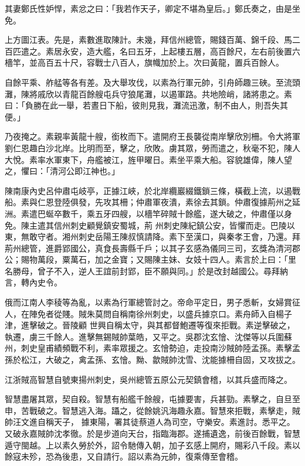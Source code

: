 \begin{pinyinscope}
 其妻鄭氏性妒悍，素忿之曰：「我若作天子，卿定不堪為皇后。」鄭氏奏之，由是坐免。



 上方圖江表。先是，素數進取陳計。未幾，拜信州總管，賜錢百萬、錦千段、馬二百匹遣之。素居永安，造大艦，名曰五牙，上起樓五層，高百餘尺，左右前後置六檣竿，並高百五十尺，容戰士八百人，旗幟加於上。次曰黃龍，置兵百餘人。



 自餘平乘、舴艋等各有差。及大舉攻伐，以素為行軍元帥，引舟師趣三硤。至流頭灘，陳將戚欣以青龍百餘艘屯兵守狼尾灘，以遏軍路。共地險峭，諸將患之。素曰：「負勝在此一舉，若晝日下船，彼則見我，灘流迅激，制不由人，則吾失其
 便。」



 乃夜掩之。素親率黃龍十艘，銜枚而下。遣開府王長襲從南岸擊欣別柵。令大將軍劉仁恩趣白沙北岸。比明而至，擊之，欣敗。虜其眾，勞而遣之，秋毫不犯，陳人大悅。素率水軍東下，舟艦被江，旌甲曜日。素坐平乘大船。容貌雄偉，陳人望之，懼曰：「清河公即江神也。」



 陳南康內史呂仲肅屯岐亭，正據江峽，於北岸纜巖綴鐵鎖三條，橫截上流，以遏戰船。素與仁恩登陸俱發，先攻其柵；仲肅軍夜潰，素徐去其鎖。仲肅復據荊州之延洲。素遣巴蜒卒數千，乘五牙四艘，以檣竿碎賊十餘艦，遂大破之，仲肅僅以身免。陳主遣其信州刺史顧覺鎮安蜀城，荊
 州刺史陳紀鎮公安，皆懼而走。巴陵以東，無敢守者。湘州刺史岳陽王陳叔慎請降。素下至漢口，與秦孝王會，乃還。拜荊州總管，進爵郢國公，真食長壽縣千戶；以其子玄感為儀同三司，玄獎為清河郡公；賜物萬段，粟萬石，加之金寶；又賜陳主妹、女妓十四人。素言於上曰：「里名勝母，曾子不入，逆人王誼前封郢，臣不願與同。」於是改封越國公。尋拜納言，轉內史令。



 俄而江南人李稜等為亂，以素為行軍總管討之。帝命平定日，男子悉斬，女婦賞征人，在陣免者從賤。賊朱莫問自稱南徐州刺史，以盛兵據京口。素舟師入自楊子津，進擊破之。晉陵顧
 世興自稱太守，與其都督鮑遷等復來拒戰。素逆擊破之，執遷，虜三千餘人。進擊無錫賊帥葉皓，又平之。吳郡沈玄懀、沈傑等以兵圍蘇州，刺史皇甫績頻戰不利，素率眾援之。玄懀勢迫，走投南沙賊帥陸孟孫。素擊孟孫於松江，大破之，禽孟孫、玄懀。黝、歙賊帥沈雪、沈能據柵自固，又攻拔之。



 江浙賊高智慧自號東揚州刺史，吳州總管五原公元契鎮會稽，以其兵盛而降之。



 智慧盡屠其眾，契自殺。智慧有船艦千餘艘，屯據要害，兵甚勁。素擊之，自旦至申，苦戰破之。智慧逃入海。躡之，從餘姚汎海趣永嘉。智慧來拒戰，素擊走，賊帥汪文進自稱天子，
 據東陽，署其徒蔡道人為司空，守樂安。素進討。悉平之。又破永嘉賊帥沈孝徹。於是步道向天台，指臨海郡。遂捕遺逸，前後百餘戰，智慧遁守閩越。上以素久勞於外，詔令馳傳入朝，加子玄感上開府，賜彩八千段。素以餘寇未殄，恐為後患，又自請行。詔以素為元帥，復乘傳至會稽。




\end{pinyinscope}

